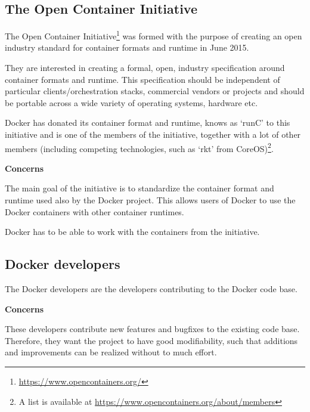 \subsection*{The Open Container Initiative}

The Open Container Initiative\footnote{\url{https://www.opencontainers.org/}} was formed with the purpose of creating an open industry standard for container formats and runtime in June 2015.

They are interested in creating a formal, open, industry specification around container formats and runtime. This specification should be independent of particular clients/orchestration stacks, commercial vendors or projects and should be portable across a wide variety of operating systems, hardware etc.

Docker has donated its container format and runtime, knows as `runC' to this initiative and is one of the members of the initiative, together with a lot of other members (including competing technologies, such as `rkt' from CoreOS)\footnote{A list is available at \url{https://www.opencontainers.org/about/members}}.

\textbf{Concerns}
\begin{description}[labelindent=25pt,style=multiline,leftmargin=4.0cm,font=\normalfont\itshape]

\item[Portability] The main goal of the initiative is to standardize the container format and runtime used also by the Docker project. This allows users of Docker to use the Docker containers with other container runtimes.

\item[Interoperability] Docker has to be able to work with the containers from the initiative.

\end{description}

\subsection*{Docker developers}
The Docker developers are the developers contributing to the Docker code base.

\textbf{Concerns}
\begin{description}[labelindent=25pt,style=multiline,leftmargin=4.0cm,font=\normalfont\itshape]

\item[Maintainability] These developers contribute new features and bugfixes to the existing code base. Therefore, they want the project to have good modifiability, such that additions and improvements can be realized without to much effort.


\end{description}

